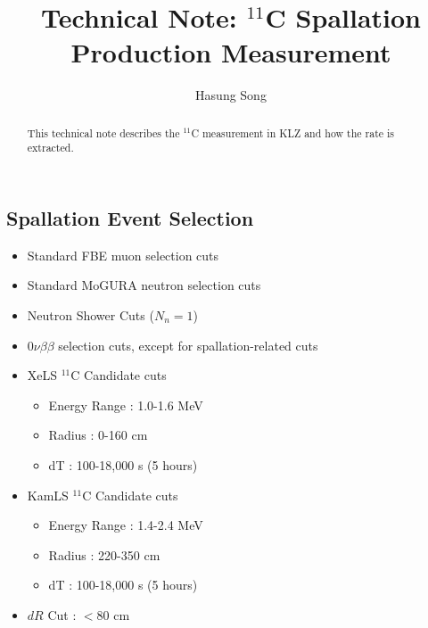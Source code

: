 \documentclass[12pt,letterpaper]{article}
\begin{document}
\title{Technical Note: $^{11}$C Spallation Production Measurement}
\author{Hasung Song}
\maketitle
\begin{abstract}
	This technical note describes the $^{11}$C measurement in KLZ and how the rate is extracted.
\end{abstract}

\subsection*{Spallation Event Selection}
\begin{itemize}
	\item Standard FBE muon selection cuts
	\item Standard MoGURA neutron selection cuts
	\item Neutron Shower Cuts ($N_n=1$)
	\item $0\nu\beta\beta$ selection cuts, except for spallation-related cuts
	\item XeLS $^{11}$C Candidate cuts
	\begin{itemize}
		\item Energy Range  : 1.0-1.6 MeV
		\item Radius : 0-160 cm
		\item dT : 100-18,000 s (5 hours)
	\end{itemize}
	\item KamLS $^{11}$C Candidate cuts
	\begin{itemize}
		\item Energy Range  : 1.4-2.4 MeV
		\item Radius : 220-350 cm
		\item dT : 100-18,000 s (5 hours)
	\end{itemize}
	\item $dR$ Cut : $<80$ cm
\end{itemize}
\end{document}
